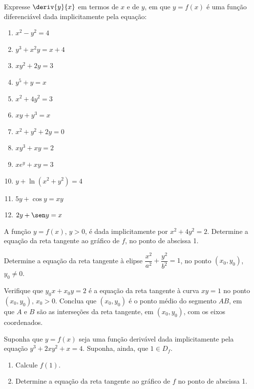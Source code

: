 \begin{exercicio}[4]
\label{ex:7.13.4}
Expresse $\deriv{y}{x}$ em termos de $x$ e de $y$, em que $y = f(x)$ é uma função diferenciável dada implicitamente pela equação:
\begin{enumerate}[label=\alph*)]
    \item $x^2 - y^2 = 4$
    \item $y^3 + x^2 y = x + 4$
    \item $xy^2 + 2y = 3$
    \item $y^5 + y = x$
    \item $x^2 + 4y^2 = 3$
    \item $xy + y^3 = x$
    \item $x^2 + y^2 + 2y = 0$
    \item $xy^3 + xy = 2$
    \item $xe^y + xy = 3$
    \item $y + \ln(x^2 + y^2) = 4$
    \item $5y + \cos y = xy$
    \item $2y + \sen y = x$
\end{enumerate}
\end{exercicio}

\begin{exercicio}[5]
\label{ex:7.13.5}
A função $y = f(x)$, $y > 0$, é dada implicitamente por $x^2 + 4y^2 = 2$. Determine a equação da reta tangente ao gráfico de $f$, no ponto de abscissa 1.
\end{exercicio}

\begin{exercicio}[6]
\label{ex:7.13.6}
Determine a equação da reta tangente à elipse $\dfrac{x^2}{a^2} + \dfrac{y^2}{b^2} = 1$, no ponto $(x_0, y_0)$, $y_0 \neq 0$.
\end{exercicio}

\begin{exercicio}[7]
\label{ex:7.13.7}
Verifique que $y_0 x + x_0 y = 2$ é a equação da reta tangente à curva $xy = 1$ no ponto $(x_0, y_0)$, $x_0 > 0$. Conclua que $(x_0, y_0)$ é o ponto médio do segmento $AB$, em que $A$ e $B$ são as interseções da reta tangente, em $(x_0, y_0)$, com os eixos coordenados.
\end{exercicio}

\begin{exercicio}[8]
\label{ex:7.13.8}
Suponha que $y = f(x)$ seja uma função derivável dada implicitamente pela equação $y^3 + 2xy^2 + x = 4$. Suponha, ainda, que $1 \in D_f$.
\begin{enumerate}[label=\alph*)]
    \item Calcule $f(1)$.
    \item Determine a equação da reta tangente ao gráfico de $f$ no ponto de abscissa 1.
\end{enumerate}
\end{exercicio}


